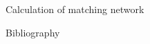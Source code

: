 \documentclass{beamer}
\begin{document}
\begin{frame}{Calculation of matching network}

\end{frame}


\begin{frame}{Bibliography}

\end{frame}

\end{document}
